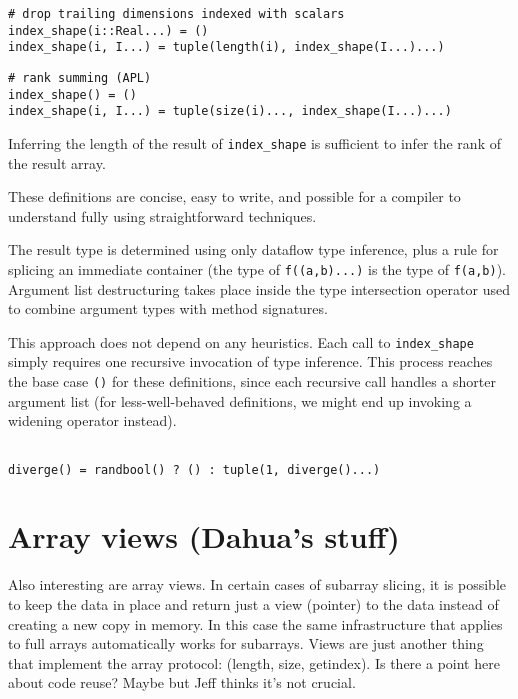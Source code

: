\documentclass[preprint]{sigplanconf}
\begin{document}
\begin{verbatim}
# drop trailing dimensions indexed with scalars
index_shape(i::Real...) = ()
index_shape(i, I...) = tuple(length(i), index_shape(I...)...)
\end{verbatim}

\begin{verbatim}
# rank summing (APL)
index_shape() = ()
index_shape(i, I...) = tuple(size(i)..., index_shape(I...)...)
\end{verbatim}

Inferring the length of the result of \texttt{index\_shape} is sufficient to
infer the rank of the result array.

These definitions are concise, easy to write, and possible for a compiler to
understand fully using straightforward techniques.


The result type is determined using only dataflow type inference, plus a rule
for splicing an immediate container (the type of \texttt{f((a,b)...)} is the
type of \texttt{f(a,b)}). Argument list destructuring takes place inside the
type intersection operator used to combine argument types with method
signatures.

This approach does not depend on any heuristics. Each call to
\texttt{index\_shape} simply requires one recursive invocation of type
inference. This process reaches the base case \texttt{()} for these
definitions, since each recursive call handles a shorter argument list (for
less-well-behaved definitions, we might end up invoking a widening operator
instead).

\begin{verbatim}

diverge() = randbool() ? () : tuple(1, diverge()...)

\end{verbatim}

\section{Array views (Dahua's stuff)}

Also interesting are array views. In certain cases of subarray slicing, it is
possible to keep the data in place and return just a view (pointer) to the
data instead of creating a new copy in memory. In this case the same
infrastructure that applies to full arrays automatically works for subarrays.
Views are just another thing that implement the array protocol: (length, size,
getindex). Is there a point here about code reuse? Maybe but Jeff thinks it's
not crucial.
\end{document}
